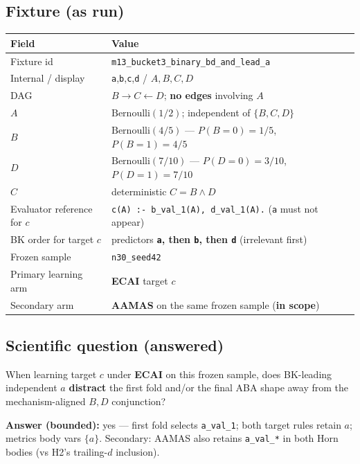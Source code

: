 \documentclass[11pt]{article}
\begin{document}
\subsection{Fixture (as run)}

\begin{center}
\begin{tabular}{@{}lL{0.62\textwidth}@{}}
\toprule
Field & Value \\
\midrule
Fixture id & \texttt{m13\_bucket3\_binary\_bd\_and\_lead\_a} \\
Internal / display & \texttt{a},\texttt{b},\texttt{c},\texttt{d} / \(A,B,C,D\) \\
DAG & \(B \rightarrow C \leftarrow D\); \textbf{no edges} involving \(A\) \\
\(A\) & \(\mathrm{Bernoulli}(1/2)\); independent of \(\{B,C,D\}\) \\
\(B\) & \(\mathrm{Bernoulli}(4/5)\) --- \(P(B{=}0)=1/5\), \(P(B{=}1)=4/5\) \\
\(D\) & \(\mathrm{Bernoulli}(7/10)\) --- \(P(D{=}0)=3/10\), \(P(D{=}1)=7/10\) \\
\(C\) & deterministic \(C = B \land D\) \\
Evaluator reference for \(c\) &
  \texttt{c(A) :- b\_val\_1(A), d\_val\_1(A).} (\texttt{a} must not appear) \\
BK order for target \(c\) & predictors \textbf{\texttt{a}, then \texttt{b}, then
  \texttt{d}} (irrelevant first) \\
Frozen sample & \texttt{n30\_seed42} \\
Primary learning arm & \textbf{ECAI} target \(c\) \\
Secondary arm & \textbf{AAMAS} on the same frozen sample (\textbf{in scope}) \\
\bottomrule
\end{tabular}
\end{center}

\subsection{Scientific question (answered)}

{\raggedright
When learning target \(c\) under \textbf{ECAI} on this frozen sample, does
BK-leading independent \(a\) \textbf{distract} the first fold and/or the final
ABA shape away from the mechanism-aligned \(B,D\) conjunction?
\par}

\textbf{Answer (bounded):} yes --- first fold selects \texttt{a\_val\_1}; both
target rules retain \(a\); metrics body vars \(\{a\}\).
Secondary: AAMAS also retains \texttt{a\_val\_*} in both Horn bodies (vs H2's
trailing-\(d\) inclusion).
\end{document}
